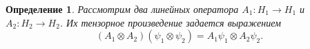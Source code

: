 \documentclass[%
master,         %
subf,           %
href,           %
,times         %
]{disser}
\numberwithin{equation}{section}
\numberwithin{figure}{section}
\newtheorem{definition}{Определение}[section]
\begin{document}
\begin{definition}
Рассмотрим два линейных оператора $A_1: H_1\to H_1$ и $A_2: H_2\to H_2$. Их тензорное произведение задается выражением
\[
(A_1\otimes A_2)(\psi_1\otimes \psi_2) = A_1\psi_1 \otimes A_2\psi_2.
\]
\end{definition}
\end{document}
